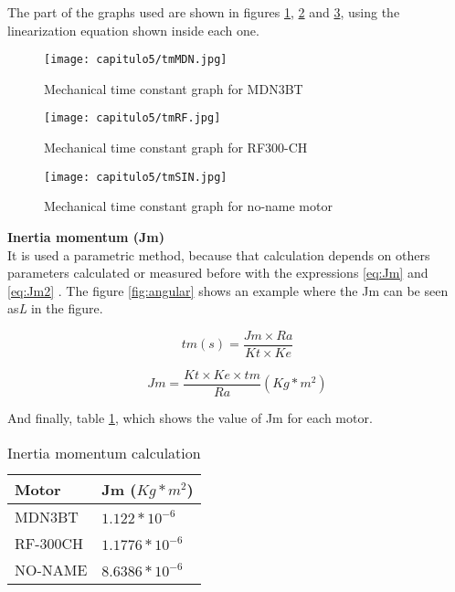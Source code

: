 The part of the graphs used are shown in figures \ref{fig:tm1}, \ref{fig:tm2} and \ref{fig:tm3}, using the linearization equation shown inside each one.

\begin{figure}[H]
\centering
		\texttt{[image: capitulo5/tmMDN.jpg]}
	\caption{Mechanical time constant graph for MDN3BT }
	\label{fig:tm1}
\end{figure}
\begin{figure}[H]
\centering
		\texttt{[image: capitulo5/tmRF.jpg]}
	\caption{Mechanical time constant  graph for RF300-CH }
	\label{fig:tm2}
\end{figure}
\begin{figure}[H]
\centering
		\texttt{[image: capitulo5/tmSIN.jpg]}
	\caption{Mechanical time constant graph for no-name motor}
	\label{fig:tm3}
\end{figure}


\textbf{Inertia momentum (Jm)} \\ 
It is used a parametric method, because that calculation depends on others parameters calculated  or measured before with the expressions \ref{eq:Jm} and \ref{eq:Jm2} . The figure \ref{fig:angular} shows an example where the Jm can be seen as\textit{L} in the figure.

\begin{equation}   
tm(s)= \frac{Jm \times Ra}{Kt \times Ke} 
\end{equation}

\begin{equation}   
Jm = \frac{Kt \times Ke \times tm}{Ra} (Kg*m^2)
\label{eq:Jm2}
\end{equation}

And finally, table \ref{tab:Jm}, which shows the value of Jm for each motor.

\begin{table}[H]

\centering
\begin{tabular}{ | l | l |}
\hline\hline
	\textbf{Motor} & \textbf{Jm ($Kg*m^2$)} \\ \hline
	MDN3BT & $1.122*10^{-6}$ \\ \hline
RF-300CH & $1.1776 *10^{-6}$ \\ \hline
NO-NAME & $8.6386*10^{-6}$\\ \hline\hline 
\end{tabular}
\caption{Inertia momentum calculation} \label{tab:Jm}
\end{table}\\

